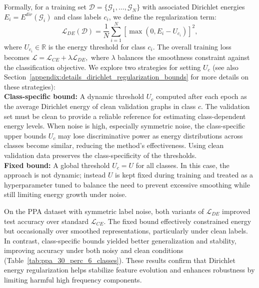 Formally, for a training set $\mathcal{D} = \{ \mathcal{G}_1, \ldots, \mathcal{G}_N \}$ with associated Dirichlet energies $E_i = E^{dir}(\mathcal{G}_i)$ and class labels $c_i$, we define the regularization term:
\begin{equation}
\label{eq: regularization term}
    \mathcal{L}_{DE}(\mathcal{D}) = \frac{1}{N} \sum_{i=1}^{N} \left[\max(0, E_i - U_{c_i})\right]^2,
\end{equation}
where $U_{c_i} \in \mathbb{R}$ is the energy threshold for class $c_i$. The overall training loss becomes \(
    \mathcal{L} = \mathcal{L}_{CE} + \lambda \mathcal{L}_{DE},\)
where $\lambda$ balances the smoothness constraint against the classification objective.
We explore two strategies for setting $U_c$ (see also Section~\ref{appendix:details_dirichlet_regularization_bounds} for more details on these strategies):\\
\textbf{Class-specific bound:} A dynamic threshold $U_c$ computed after each epoch as the average Dirichlet energy of clean validation graphs in class $c$. The validation set must be clean to provide a reliable reference for estimating class-dependent energy levels. When noise is high, especially symmetric noise, the class-specific upper bounds $U_c$ may lose discriminative power as energy distributions across classes become similar, reducing the method’s effectiveness. Using clean validation data preserves the class-specificity of the thresholds.\\
\textbf{Fixed bound:} A global threshold $U_c = U$ for all classes. In this case, the approach is not dynamic; instead $U$ is kept fixed during training and treated as a hyperparameter tuned to balance the need to prevent excessive smoothing while still limiting energy growth under noise.

On the PPA dataset with symmetric label noise, both variants of $\mathcal{L}_{DE}$ improved test accuracy over standard $\mathcal{L}_{CE}$. The fixed bound effectively constrained energy but occasionally over smoothed representations, particularly under clean labels. In contrast, class-specific bounds yielded better generalization and stability, improving accuracy under both noisy and clean conditions (Table~\ref{tab:ppa_30_perc_6_classes}). These results confirm that Dirichlet energy regularization helps stabilize feature evolution and enhances robustness by limiting harmful high frequency components.

